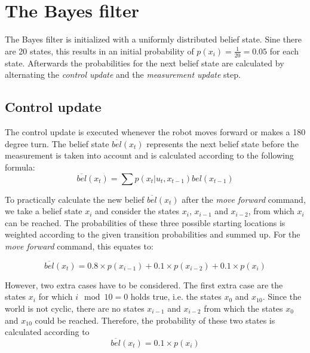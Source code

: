 \documentclass[10pt,a4paper]{article}
\begin{document}
	\section{The Bayes filter}
	The Bayes filter is initialized with a uniformly distributed belief state. Sine there are 20 states, this results in an initial probability of $p(x_i)=\frac{1}{20}=0.05$ for each state. Afterwards the probabilities for the next belief state are calculated by alternating the \textit{control update} and the \textit{measurement update} step.
	
		\subsection{Control update}
		The control update is executed whenever the robot moves forward or makes a 180 degree turn. The belief state $\overline{bel}(x_t)$ represents the next belief state before the measurement is taken into account and is calculated according to the following formula:
		\begin{displaymath}
			\overline{bel}(x_t) = \sum p(x_t|u_t,x_{t-1})bel(x_{t-1})
		\end{displaymath}
		
		To practically calculate the new belief $\overline{bel}(x_t)$ after the \textit{move forward} command, we take a belief state $x_i$ and consider the states $x_i$, $x_{i-1}$ and $x_{i-2}$, from which $x_i$ can be reached. The probabilities of these three possible starting locations is weighted according to the given transition probabilities and summed up. For the \textit{move forward} command, this equates to:
		
		\begin{displaymath}
			\overline{bel}(x_t) = 0.8\times p(x_{i-1}) + 0.1\times p(x_{i-2}) + 0.1\times p(x_i)
		\end{displaymath}
		
		However, two extra cases have to be considered. The first extra case are the states $x_i$ for which $i \mod{10} = 0$ holds true, i.e. the states $x_0$ and $x_{10}$. Since the world is not cyclic, there are no states $x_{i-1}$ and $x_{i-2}$ from which the states $x_0$ and $x_{10}$ could be reached. Therefore, the probability of these two states is calculated according to
		\begin{displaymath}
			\overline{bel}(x_t) = 0.1\times p(x_i)
		\end{displaymath}
		
\end{document}
